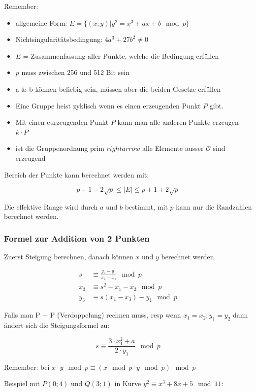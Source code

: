 \documentclass[12pt]{scrartcl}
\begin{document}
Remember:

\begin{itemize}
    \item allgemeine Form: $E = \{(x;y) | y^2 = x^3 + ax + b \mod p\}$
    \item Nichtsingularitätsbedingung: $4a^3 + 27b^2 \neq 0$
    \item $E$ = Zusammenfassung aller Punkte, welche die Bedingung erfüllen
    \item $p$ muss zwischen 256 und 512 Bit sein
    \item a \& b können beliebig sein, müssen aber die beiden Gesetze erfüllen
    \item Eine Gruppe heist zyklisch wenn es einen erzeugenden Punkt $P$ gibt.
    \item Mit einen eurzeugenden Punkt $P$ kann man alle anderen Punkte erzeugen $k \cdot P$
    \item ist die Gruppenordnung prim $rightarrow$ alle Elemente ausser $\mathcal{O}$ sind erzeugend
\end{itemize}

Bereich der Punkte kann berechnet werden mit: 

\[ p+1 - 2 \sqrt{p} \leq |E| \leq p + 1 + 2 \sqrt{p} \]

Die effektive Range wird durch $a$ und $b$ bestimmt, mit $p$ kann nur die Randzahlen
berechnet werden.


\subsubsection{Formel zur Addition von 2 Punkten}

Zuerst Steigung berechnen, danach können $x$ und $y$ berechnet werden.


\begin{align*}
    s &\equiv \frac{y_2 - y_1}{x_2 - x_1} \mod p \\
    x_3 &\equiv s^2 - x_1 - x_2 \mod p \\
    y_3 &\equiv s(x_1 - x_3) - y_1 \mod p
\end{align*}


\newpage
Falls man P + P (Verdoppelung) rechnen muss, resp wenn $x_1 = x_2;y_1 = y_2$ dann ändert sich die Steigungsformel zu:

\[ s \equiv \frac{3 \cdot x_1^2 + a}{2 \cdot y_1} \mod p \]


Remember: bei $x \cdot y \mod p \equiv (x \mod p \cdot y \mod p) \mod p$

Beispiel mit $P(0;4)$ und $Q(3;1)$ in Kurve $y^2 \equiv x^3 +8x + 5 \mod 11$:
\end{document}
